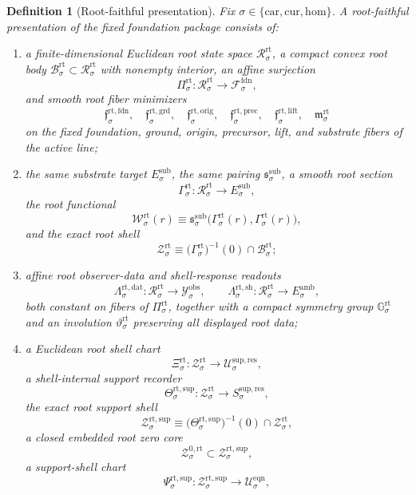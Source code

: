 \documentclass[11pt]{article}
\newcommand{\Car}{\mathrm{car}}
\newcommand{\Cur}{\mathrm{cur}}
\newcommand{\Hom}{\mathrm{hom}}
\newcommand{\DataSpace}[1]{\mathcal Y_{#1}^{\mathrm{obs}}}
\newcommand{\AmbientTarget}[1]{E_{#1}^{\mathrm{amb}}}
\newcommand{\SubTarget}[1]{E_{#1}^{\mathrm{sub}}}
\newcommand{\SubPair}[1]{\mathfrak s_{#1}^{\mathrm{sub}}}
\newcommand{\FoundSpace}[1]{\mathcal F_{#1}^{\mathrm{fdn}}}
\newcommand{\RootSpace}[1]{\mathcal R_{#1}^{\mathrm{rt}}}
\newcommand{\RootBody}[1]{\mathcal B_{#1}^{\mathrm{rt}}}
\newcommand{\RootProj}[1]{\Pi_{#1}^{\mathrm{rt}}}
\newcommand{\RootFoundMin}[1]{\mathfrak f_{#1}^{\mathrm{rt,fdn}}}
\newcommand{\RootGroundMin}[1]{\mathfrak f_{#1}^{\mathrm{rt,grd}}}
\newcommand{\RootOrigMin}[1]{\mathfrak f_{#1}^{\mathrm{rt,orig}}}
\newcommand{\RootPrecMin}[1]{\mathfrak f_{#1}^{\mathrm{rt,prec}}}
\newcommand{\RootLiftMin}[1]{\mathfrak f_{#1}^{\mathrm{rt,lift}}}
\newcommand{\RootSubMin}[1]{\mathfrak m_{#1}^{\mathrm{rt}}}
\newcommand{\RootSection}[1]{\Gamma_{#1}^{\mathrm{rt}}}
\newcommand{\RootFunctional}[1]{\mathscr W_{#1}^{\mathrm{rt}}}
\newcommand{\RootData}[1]{\Lambda_{#1}^{\mathrm{rt,dat}}}
\newcommand{\RootShellMap}[1]{\Lambda_{#1}^{\mathrm{rt,sh}}}
\newcommand{\RootSym}[1]{\mathbb G_{#1}^{\mathrm{rt}}}
\newcommand{\RootTime}[1]{\vartheta_{#1}^{\mathrm{rt}}}
\newcommand{\RootShellSet}[1]{\mathcal Z_{#1}^{\mathrm{rt}}}
\newcommand{\RootChart}[1]{\Xi_{#1}^{\mathrm{rt}}}
\newcommand{\RootSupport}[1]{\Theta_{#1}^{\mathrm{rt,sup}}}
\newcommand{\RootSupportShell}[1]{\mathcal Z_{#1}^{\mathrm{rt,sup}}}
\newcommand{\RootZeroCore}[1]{\mathcal Z_{#1}^{0,\mathrm{rt}}}
\newcommand{\RootEqChart}[1]{\Psi_{#1}^{\mathrm{rt,sup}}}
\newcommand{\ResSpace}[1]{\mathcal U_{#1}^{\mathrm{sup,res}}}
\newcommand{\ResTarget}[1]{S_{#1}^{\mathrm{sup,res}}}
\newcommand{\EqnSpace}[1]{\mathcal U_{#1}^{\mathrm{eqn}}}
\newtheorem{definition}{Definition}
\begin{document}
\begin{definition}[Root-faithful presentation]
\label{def:faithful}
Fix \(\sigma\in\{\Car,\Cur,\Hom\}\). A \emph{root-faithful presentation} of the fixed foundation package consists of:
\begin{enumerate}
    \item a finite-dimensional Euclidean root state space \(\RootSpace{\sigma}\), a compact convex root body \(\RootBody{\sigma}\subset\RootSpace{\sigma}\) with nonempty interior, an affine surjection
    \[
    \RootProj{\sigma}:\RootSpace{\sigma}\to\FoundSpace{\sigma},
    \]
    and smooth root fiber minimizers
    \[
    \RootFoundMin{\sigma},\quad
    \RootGroundMin{\sigma},\quad
    \RootOrigMin{\sigma},\quad
    \RootPrecMin{\sigma},\quad
    \RootLiftMin{\sigma},\quad
    \RootSubMin{\sigma}
    \]
    on the fixed foundation, ground, origin, precursor, lift, and substrate fibers of the active line;
    \item the same substrate target \(\SubTarget{\sigma}\), the same pairing \(\SubPair{\sigma}\), a smooth root section
    \[
    \RootSection{\sigma}:\RootSpace{\sigma}\to\SubTarget{\sigma},
    \]
    the root functional
    \[
    \RootFunctional{\sigma}(r)
    \equiv
    \SubPair{\sigma}\bigl(\RootSection{\sigma}(r),\RootSection{\sigma}(r)\bigr),
    \]
    and the exact root shell
    \[
    \RootShellSet{\sigma}
    \equiv
    \bigl(\RootSection{\sigma}\bigr)^{-1}(0)\cap\RootBody{\sigma};
    \]
    \item affine root observer-data and shell-response readouts
    \[
    \RootData{\sigma}:\RootSpace{\sigma}\to\DataSpace{\sigma},
    \qquad
    \RootShellMap{\sigma}:\RootSpace{\sigma}\to\AmbientTarget{\sigma},
    \]
    both constant on fibers of \(\RootProj{\sigma}\), together with a compact symmetry group \(\RootSym{\sigma}\) and an involution \(\RootTime{\sigma}\) preserving all displayed root data;
    \item a Euclidean root shell chart
    \[
    \RootChart{\sigma}:\RootShellSet{\sigma}\to\ResSpace{\sigma},
    \]
    a shell-internal support recorder
    \[
    \RootSupport{\sigma}:\RootShellSet{\sigma}\to\ResTarget{\sigma},
    \]
    the exact root support shell
    \[
    \RootSupportShell{\sigma}
    \equiv
    \bigl(\RootSupport{\sigma}\bigr)^{-1}(0)\cap\RootShellSet{\sigma},
    \]
    a closed embedded root zero core
    \[
    \RootZeroCore{\sigma}\subset\RootSupportShell{\sigma},
    \]
    a support-shell chart
    \[
    \RootEqChart{\sigma}:\RootSupportShell{\sigma}\to\EqnSpace{\sigma},
    \]

\end{enumerate}
\end{definition}
\end{document}
